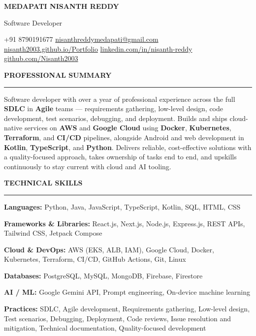 \documentclass[11pt,a4paper]{article}
\newcommand{\resumeSection}[1]{%
  \vspace{7pt}%
  {\large\bfseries\color{primary}\MakeUppercase{#1}}\par
  \vspace{1pt}%
  \textcolor{secondary}{\rule{\textwidth}{0.6pt}}\par
  \vspace{3pt}%
}
\newcommand{\skillRow}[2]{\textbf{#1:} #2\par\vspace{2pt}}
\begin{document}
\begin{center}
  {\Huge\bfseries MEDAPATI NISANTH REDDY}\par
  \vspace{3pt}
  {\large Software Developer}\par
  \vspace{5pt}
  +91 8790191677 \textbar{}
  \href{mailto:nisanthreddymedapati@gmail.com}{nisanthreddymedapati@gmail.com} \\[3pt]
  \href{https://nisanth2003.github.io/Portfolio/}{nisanth2003.github.io/Portfolio} \textbar{}
  \href{https://www.linkedin.com/in/nisanth-reddy/}{linkedin.com/in/nisanth-reddy} \textbar{}
  \href{https://github.com/Nisanth2003}{github.com/Nisanth2003}
\end{center}

\vspace{2pt}

\resumeSection{Professional Summary}

Software developer with over a year of professional experience across the full
\textbf{SDLC} in \textbf{Agile} teams --- requirements gathering, low-level design, code
development, test scenarios, debugging, and deployment. Builds and ships cloud-native
services on \textbf{AWS} and \textbf{Google Cloud} using \textbf{Docker},
\textbf{Kubernetes}, \textbf{Terraform}, and \textbf{CI/CD} pipelines, alongside Android
and web development in \textbf{Kotlin}, \textbf{TypeScript}, and \textbf{Python}.
Delivers reliable, cost-effective solutions with a quality-focused approach, takes
ownership of tasks end to end, and upskills continuously to stay current with cloud and
AI tooling.

\resumeSection{Technical Skills}

\skillRow{Languages}{Python, Java, JavaScript, TypeScript, Kotlin, SQL, HTML, CSS}
\skillRow{Frameworks \& Libraries}{React.js, Next.js, Node.js, Express.js, REST APIs, Tailwind CSS, Jetpack Compose}
\skillRow{Cloud \& DevOps}{AWS (EKS, ALB, IAM), Google Cloud, Docker, Kubernetes, Terraform, CI/CD, GitHub Actions, Git, Linux}
\skillRow{Databases}{PostgreSQL, MySQL, MongoDB, Firebase, Firestore}
\skillRow{AI / ML}{Google Gemini API, Prompt engineering, On-device machine learning}
\skillRow{Practices}{SDLC, Agile development, Requirements gathering, Low-level design, Test scenarios, Debugging, Deployment, Code reviews, Issue resolution and mitigation, Technical documentation, Quality-focused development}
\end{document}
